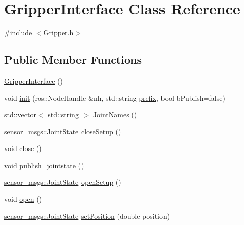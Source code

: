 \hypertarget{classGripperInterface}{\section{Gripper\-Interface Class Reference}
\label{classGripperInterface}
}


{\ttfamily \#include $<$Gripper.\-h$>$}

\subsection*{Public Member Functions}
\begin{DoxyCompactItemize}
\item 
\hyperlink{classGripperInterface_a029b0f601974702f9e5eabaebc025f0f}{Gripper\-Interface} ()
\item 
void \hyperlink{classGripperInterface_aa08d8e1ef6d63f4e50a0d7359b800fe8}{init} (ros\-::\-Node\-Handle \&nh, std\-::string \hyperlink{classGripperInterface_af8175e1d6b1bd3d25a285cc2063bfae3}{prefix}, bool b\-Publish=false)
\item 
std\-::vector$<$ std\-::string $>$ \hyperlink{classGripperInterface_ab65fbcdfc969ba5d01c9f5d4256f0981}{Joint\-Names} ()
\item 
\hyperlink{RCS_8h_aa4adb93a26caa4dacba9c9614e283245}{sensor\-\_\-msgs\-::\-Joint\-State} \hyperlink{classGripperInterface_a4e880e17fb0e340d13ec474c5b1e242b}{close\-Setup} ()
\item 
void \hyperlink{classGripperInterface_a3a5a0f98239a390004780a546da0964d}{close} ()
\item 
void \hyperlink{classGripperInterface_abc58ac3146134b048f27dd41214c90e8}{publish\-\_\-jointstate} ()
\item 
\hyperlink{RCS_8h_aa4adb93a26caa4dacba9c9614e283245}{sensor\-\_\-msgs\-::\-Joint\-State} \hyperlink{classGripperInterface_a0b48f2f499ea51aeddbac9cef14c41da}{open\-Setup} ()
\item 
void \hyperlink{classGripperInterface_acd38ac748d96a2831cebd11b00421ee0}{open} ()
\item 
\hyperlink{RCS_8h_aa4adb93a26caa4dacba9c9614e283245}{sensor\-\_\-msgs\-::\-Joint\-State} \hyperlink{classGripperInterface_a716fca65b73e2eab7be9d0ad09a01f75}{set\-Position} (double position)
\end{DoxyCompactItemize}
